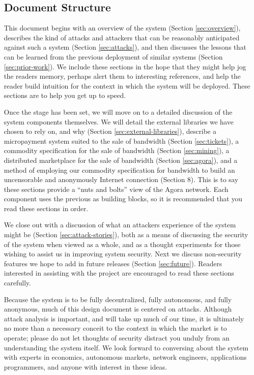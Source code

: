 \documentclass{article}
\begin{document}
\subsection{Document Structure}

This document begins with an overview of the system (Section \ref{sec:overview}), describes the kind of attacks and attackers that can be reasonably anticipated against such a system (Section \ref{sec:attacks}), and then discusses the lessons that can be learned from the previous deployment of similar systems (Section \ref{sec:prior-work}). We include these sections in the hope that they might help jog the readers memory, perhaps alert them to interesting references, and help the reader build intuition for the context in which the system will be deployed. These sections are to help you get up to speed.

Once the stage has been set, we will move on to a detailed discussion of the system components themselves. We will detail the external libraries we have chosen to rely on, and why (Section \ref{sec:external-libraries}), describe a micropayment system suited to the sale of bandwidth (Section \ref{sec:tickets}), a commodity specification for the sale of bandwidth (Section \ref{sec:mining}), a distributed marketplace for the sale of bandwidth (Section \ref{sec:agora}), and a method of employing our commodity specification for bandwidth to build an uncensorable and anonymously Internet connection (Section 8). This is to say these sections provide a “nuts and bolts” view of the Agora network. Each component uses the previous as building blocks, so it is recommended that you read these sections in order.

We close out with a discussion of what an attackers experience of the system might be (Section \ref{sec:attack-stories}), both as a means of discussing the security of the system when viewed as a whole, and as a thought experiments for those wishing to assist us in improving system security. Next we discuss non-security features we hope to add in future releases (Section \ref{sec:future}). Readers interested in assisting with the project are encouraged to read these sections carefully.

Because the system is to be fully decentralized, fully autonomous, and fully anonymous, much of this design document is centered on attacks. Although attack analysis is important, and will take up much of our time, it is ultimately no more than a necessary conceit to the context in which the market is to operate; please do not let thoughts of security distract you unduly from an understanding the system itself. We look forward to conversing about the system with experts in economics, autonomous markets, network engineers, applications programmers, and anyone with interest in these ideas.
\end{document}
